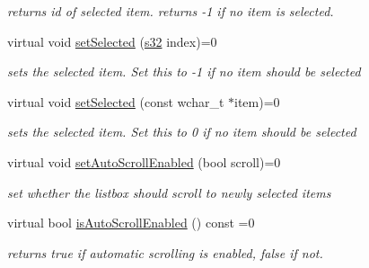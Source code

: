 \begin{DoxyCompactItemize}
\begin{DoxyCompactList}\small\item\em returns id of selected item. returns -\/1 if no item is selected. \end{DoxyCompactList}\item 
\mbox{\label{classirr_1_1gui_1_1IGUIListBox_ac981fa5b285115333b67202819230f6f}} 
virtual void \hyperlink{classirr_1_1gui_1_1IGUIListBox_ac981fa5b285115333b67202819230f6f}{set\+Selected} (\hyperlink{namespaceirr_ac66849b7a6ed16e30ebede579f9b47c6}{s32} index)=0
\begin{DoxyCompactList}\small\item\em sets the selected item. Set this to -\/1 if no item should be selected \end{DoxyCompactList}\item 
\mbox{\label{classirr_1_1gui_1_1IGUIListBox_aa6031e2a0ecbcfe80484d8271b1c9529}} 
virtual void \hyperlink{classirr_1_1gui_1_1IGUIListBox_aa6031e2a0ecbcfe80484d8271b1c9529}{set\+Selected} (const wchar\+\_\+t $\ast$item)=0
\begin{DoxyCompactList}\small\item\em sets the selected item. Set this to 0 if no item should be selected \end{DoxyCompactList}\item 
\mbox{\label{classirr_1_1gui_1_1IGUIListBox_a4d8ada56cafff847e98564283b2d06ac}} 
virtual void \hyperlink{classirr_1_1gui_1_1IGUIListBox_a4d8ada56cafff847e98564283b2d06ac}{set\+Auto\+Scroll\+Enabled} (bool scroll)=0
\begin{DoxyCompactList}\small\item\em set whether the listbox should scroll to newly selected items \end{DoxyCompactList}\item 
\mbox{\label{classirr_1_1gui_1_1IGUIListBox_af04876e1e3173e9c13bb099076743137}} 
virtual bool \hyperlink{classirr_1_1gui_1_1IGUIListBox_af04876e1e3173e9c13bb099076743137}{is\+Auto\+Scroll\+Enabled} () const =0
\begin{DoxyCompactList}\small\item\em returns true if automatic scrolling is enabled, false if not. \end{DoxyCompactList}\item 

\end{DoxyCompactItemize}
